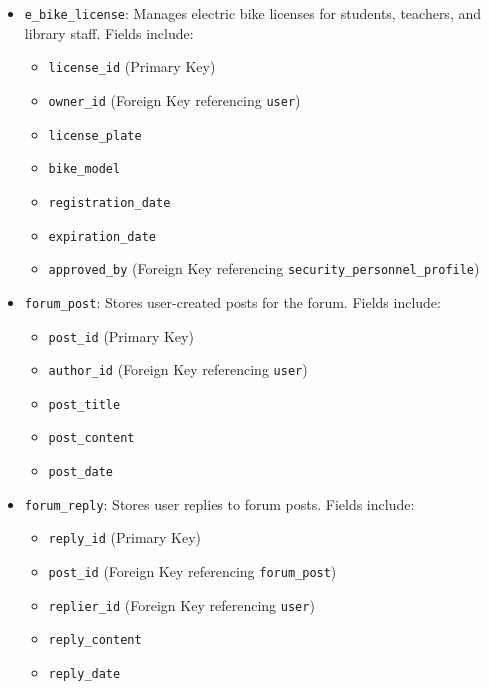 \documentclass[12pt]{article}
\begin{document}
\begin{itemize}
    \item \texttt{e\_bike\_license}: Manages electric bike licenses for students, teachers, and library staff. Fields include:
    \begin{itemize}
        \item \texttt{license\_id} (Primary Key)
        \item \texttt{owner\_id} (Foreign Key referencing \texttt{user})
        \item \texttt{license\_plate}
        \item \texttt{bike\_model}
        \item \texttt{registration\_date}
        \item \texttt{expiration\_date}
        \item \texttt{approved\_by} (Foreign Key referencing \texttt{security\_personnel\_profile})
    \end{itemize}

    \clearpage  %

    \item \texttt{forum\_post}: Stores user-created posts for the forum. Fields include:
    \begin{itemize}
        \item \texttt{post\_id} (Primary Key)
        \item \texttt{author\_id} (Foreign Key referencing \texttt{user})
        \item \texttt{post\_title}
        \item \texttt{post\_content}
        \item \texttt{post\_date}
    \end{itemize}
    
    \item \texttt{forum\_reply}: Stores user replies to forum posts. Fields include:
    \begin{itemize}
        \item \texttt{reply\_id} (Primary Key)
        \item \texttt{post\_id} (Foreign Key referencing \texttt{forum\_post})
        \item \texttt{replier\_id} (Foreign Key referencing \texttt{user})
        \item \texttt{reply\_content}
        \item \texttt{reply\_date}
    \end{itemize}
\end{itemize}
\end{document}
